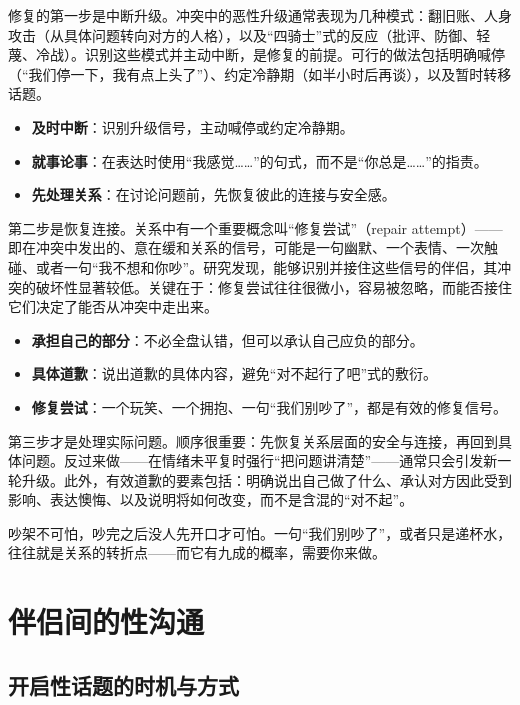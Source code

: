 \documentclass[12pt,UTF8]{ctexbook}
\begin{document}
修复的第一步是中断升级。冲突中的恶性升级通常表现为几种模式：翻旧账、人身攻击（从具体问题转向对方的人格），以及“四骑士”式的反应（批评、防御、轻蔑、冷战）。识别这些模式并主动中断，是修复的前提。可行的做法包括明确喊停（“我们停一下，我有点上头了”）、约定冷静期（如半小时后再谈），以及暂时转移话题。

\begin{itemize}
\item \textbf{及时中断}：识别升级信号，主动喊停或约定冷静期。
\item \textbf{就事论事}：在表达时使用“我感觉……”的句式，而不是“你总是……”的指责。
\item \textbf{先处理关系}：在讨论问题前，先恢复彼此的连接与安全感。
\end{itemize}

第二步是恢复连接。关系中有一个重要概念叫“修复尝试”（repair attempt）——即在冲突中发出的、意在缓和关系的信号，可能是一句幽默、一个表情、一次触碰、或者一句“我不想和你吵”。研究发现，能够识别并接住这些信号的伴侣，其冲突的破坏性显著较低。关键在于：修复尝试往往很微小，容易被忽略，而能否接住它们决定了能否从冲突中走出来。

\begin{itemize}
\item \textbf{承担自己的部分}：不必全盘认错，但可以承认自己应负的部分。
\item \textbf{具体道歉}：说出道歉的具体内容，避免“对不起行了吧”式的敷衍。
\item \textbf{修复尝试}：一个玩笑、一个拥抱、一句“我们别吵了”，都是有效的修复信号。
\end{itemize}

第三步才是处理实际问题。顺序很重要：先恢复关系层面的安全与连接，再回到具体问题。反过来做——在情绪未平复时强行“把问题讲清楚”——通常只会引发新一轮升级。此外，有效道歉的要素包括：明确说出自己做了什么、承认对方因此受到影响、表达懊悔、以及说明将如何改变，而不是含混的“对不起”。

\begin{tcolorbox}[colback=pink!5!white,colframe=red!50!black,title=贴心小叮咛]
吵架不可怕，吵完之后没人先开口才可怕。一句“我们别吵了”，或者只是递杯水，往往就是关系的转折点——而它有九成的概率，需要你来做。
\end{tcolorbox}

\section{伴侣间的性沟通}

\subsection{开启性话题的时机与方式}
\end{document}
